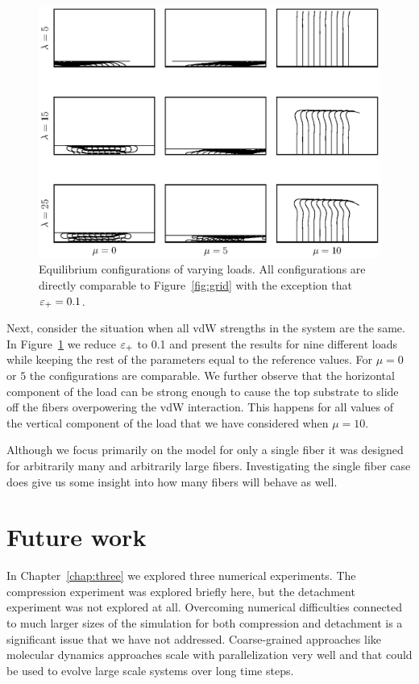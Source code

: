 	\begin{figure}
		\begin{center}
			\includegraphics[scale=1]{./fig/ch4/grid_et0.1.eps}
		\end{center}		
		\caption{Equilibrium configurations of varying loads. All configurations are directly comparable to Figure~\ref{fig:grid} with the exception that $\varepsilon_+ = 0.1$.
		\label{fig:grid_et0.1}}
	\end{figure}

	Next, consider the situation when all vdW strengths in the system are the same. In Figure~\ref{fig:grid_et0.1} we reduce $\varepsilon_+$ to 0.1 and present the results for nine different loads while keeping the rest of the parameters equal to the reference values. For $\mu = 0$ or $5$ the configurations are comparable. We further observe that the horizontal component of the load can be strong enough to cause the top substrate to slide off the fibers overpowering the vdW interaction. This happens for all values of the vertical component of the load that we have considered when $\mu = 10$.
	
	Although we focus primarily on the model for only a single fiber it was designed for arbitrarily many and arbitrarily large fibers. Investigating the single fiber case does give us some insight into how many fibers will behave as well.

\section{Future work}

In Chapter~\ref{chap:three} we explored three numerical experiments.
The compression experiment was explored briefly here, but the detachment experiment was not explored at all.
Overcoming numerical difficulties connected to much larger sizes of the simulation for both compression and detachment is a significant issue that we have not addressed.
Coarse-grained approaches like molecular dynamics approaches scale with parallelization very well and that could be used to evolve large scale systems over long time steps.

